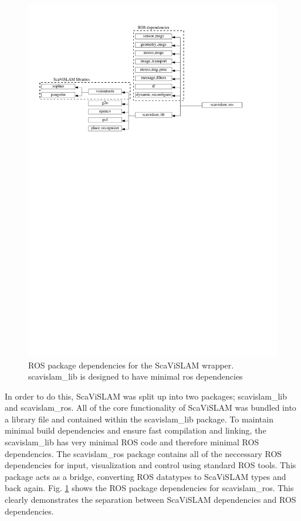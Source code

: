 \begin{figure}[h]
  \centering
    \includegraphics[width=1.0\textwidth]{chapters/images/ros_wrapper_dependencies}
  \caption{ROS package dependencies for the ScaViSLAM wrapper.  scavislam\_lib is designed to have minimal ros dependencies}
  \label{fig:scavislam_wrapper_dependencies}
\end{figure}

In order to do this, ScaViSLAM was split up into two packages; scavislam\_lib and scavislam\_ros.  All of the core functionality of ScaViSLAM was bundled into a library file and contained within the scavislam\_lib package.  To maintain minimal build dependencies and ensure fast compilation and linking, the scavislam\_lib has very minimal ROS code and therefore minimal ROS dependencies.  The scavislam\_ros package contains all of the neccessary ROS dependencies for input, visualization and control using standard ROS tools.  This package acts as a bridge, converting ROS datatypes to ScaViSLAM types and back again. Fig. \ref{fig:scavislam_wrapper_dependencies} shows the ROS package dependencies for scavislam\_ros.  This clearly demonstrates the separation between ScaViSLAM dependencies and ROS dependencies.


